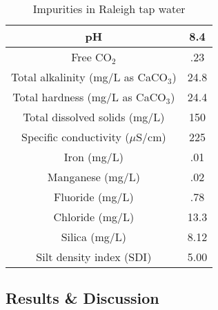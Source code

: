 \begin{table}[htpb]
  \begin{center}
    \begin{tabular}{|c |c |}
      \hline
      pH & 8.4 \\\hline
      Free CO$_2$ & .23 \\\hline
      Total alkalinity (mg/L as CaCO$_3$) & 24.8 \\\hline
      Total hardness (mg/L as CaCO$_3$) & 24.4 \\\hline
      Total dissolved solids (mg/L) & 150 \\\hline
      Specific conductivity ($\mu$S/cm) & 225 \\\hline
      Iron (mg/L) & .01 \\\hline
      Manganese (mg/L) & .02 \\\hline
      Fluoride (mg/L) & .78 \\\hline
      Chloride (mg/L) & 13.3 \\\hline
      Silica (mg/L) & 8.12 \\\hline
      Silt density index (SDI) & 5.00 \\
      \hline
    \end{tabular}
  \end{center}
  \caption{Impurities in Raleigh tap water}
  \label{tab:tap_water}
\end{table}

\subsection{Results \& Discussion}

